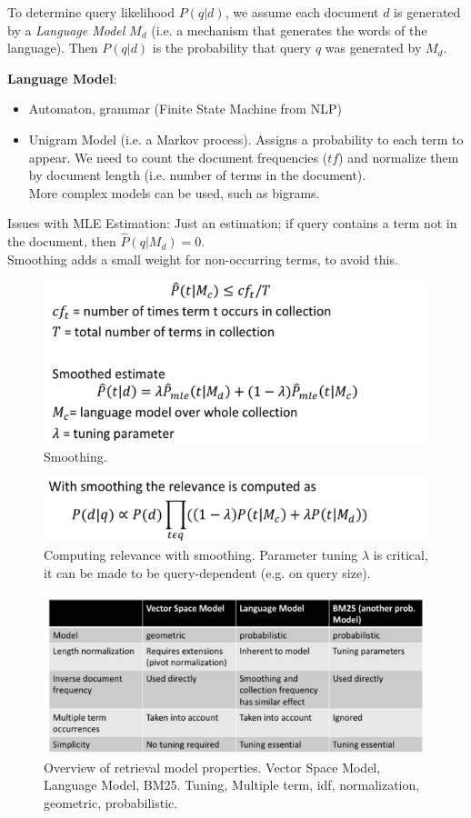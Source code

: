     To determine query likelihood $P(q|d)$, we assume each document $d$ is generated by a \emph{Language Model} $M_d$ (i.e. a mechanism that generates the words of the language). Then $P(q|d)$ is the probability that query $q$ was generated by $M_d$.

    \textbf{Language Model}:
    \begin{itemize}
      \item Automaton, grammar (Finite State Machine from NLP)
      \item Unigram Model (i.e. a Markov process). Assigns a probability to each term to appear. We need to count the document frequencies ($tf$) and normalize them by document length (i.e. number of terms in the document).\\
      More complex models can be used, such as bigrams.
    \end{itemize}

    Issues with MLE Estimation: Just an estimation; if query contains a term not in the document, then $\hat{P}(q|M_d)=0$.\\
    Smoothing adds a small weight for non-occurring terms, to avoid this.

    \begin{figure}[htp]
      \centering
        \includegraphics[width=.6\textwidth]{images/smoothing.png}
        \caption{Smoothing.}
        \label{fig:smoothing}
    \end{figure}
    \begin{figure}[htp]
      \centering
        \includegraphics[width=.6\textwidth]{images/smoothing2.png}
        \caption{Computing relevance with smoothing. Parameter tuning $\lambda$ is critical, it can be made to be query-dependent (e.g. on query size). }
        \label{fig:smoothing2}
    \end{figure}

    \begin{figure}[htp]
      \centering
        \includegraphics[width=.75\textwidth]{images/ormp.png}
        \caption{Overview of retrieval model properties. Vector Space Model, Language Model, BM25. Tuning, Multiple term, idf, normalization, geometric, probabilistic.}
        \label{fig:ormp}
    \end{figure}
\newpage
